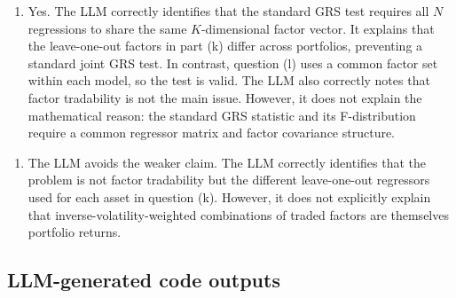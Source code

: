 \documentclass[11pt,letterpaper]{article}
\providecommand{\tightlist}{\setlength{\itemsep}{0pt}\setlength{\parskip}{0pt}}
\begin{document}
\begin{enumerate}
\def\labelenumi{(\roman{enumi})}
\tightlist
\item
  Yes. The LLM correctly identifies that the standard GRS test requires all \(N\) regressions to share the same \(K\)-dimensional factor vector. It explains that the leave-one-out factors in part (k) differ across portfolios, preventing a standard joint GRS test. In contrast, question (l) uses a common factor set within each model, so the test is valid. The LLM also correctly notes that factor tradability is not the main issue. However, it does not explain the mathematical reason: the standard GRS statistic and its F-distribution require a common regressor matrix and factor covariance structure.
\end{enumerate}


\begin{enumerate}
\def\labelenumi{(\roman{enumi})}
\setcounter{enumi}{1}
\tightlist
\item
  The LLM avoids the weaker claim. The LLM correctly identifies that the problem is not factor tradability but the different leave-one-out regressors used for each asset in question (k). However, it does not explicitly explain that inverse-volatility-weighted combinations of traded factors are themselves portfolio returns.
\end{enumerate}


\subsection*{LLM-generated code outputs}
\end{document}

